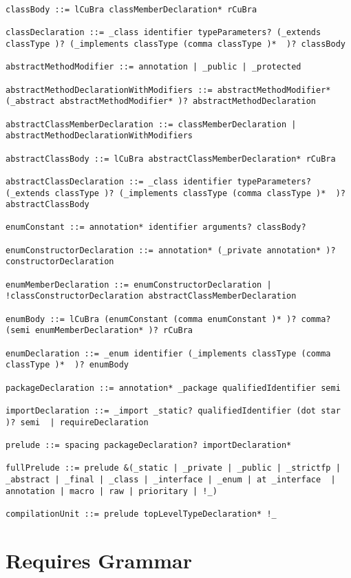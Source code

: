 \begin{lstlisting}[breaklines=true]
classBody ::= lCuBra classMemberDeclaration* rCuBra

classDeclaration ::= _class identifier typeParameters? (_extends classType )? (_implements classType (comma classType )*  )? classBody

abstractMethodModifier ::= annotation | _public | _protected

abstractMethodDeclarationWithModifiers ::= abstractMethodModifier* (_abstract abstractMethodModifier* )? abstractMethodDeclaration

abstractClassMemberDeclaration ::= classMemberDeclaration | abstractMethodDeclarationWithModifiers

abstractClassBody ::= lCuBra abstractClassMemberDeclaration* rCuBra

abstractClassDeclaration ::= _class identifier typeParameters? (_extends classType )? (_implements classType (comma classType )*  )? abstractClassBody

enumConstant ::= annotation* identifier arguments? classBody?

enumConstructorDeclaration ::= annotation* (_private annotation* )? constructorDeclaration

enumMemberDeclaration ::= enumConstructorDeclaration | !classConstructorDeclaration abstractClassMemberDeclaration

enumBody ::= lCuBra (enumConstant (comma enumConstant )* )? comma? (semi enumMemberDeclaration* )? rCuBra

enumDeclaration ::= _enum identifier (_implements classType (comma classType )*  )? enumBody

packageDeclaration ::= annotation* _package qualifiedIdentifier semi

importDeclaration ::= _import _static? qualifiedIdentifier (dot star )? semi  | requireDeclaration

prelude ::= spacing packageDeclaration? importDeclaration*

fullPrelude ::= prelude &(_static | _private | _public | _strictfp | _abstract | _final | _class | _interface | _enum | at _interface  | annotation | macro | raw | prioritary | !_)

compilationUnit ::= prelude topLevelTypeDeclaration* !_

\end{lstlisting}

\section{Requires Grammar}
\label{requires_grammar}

